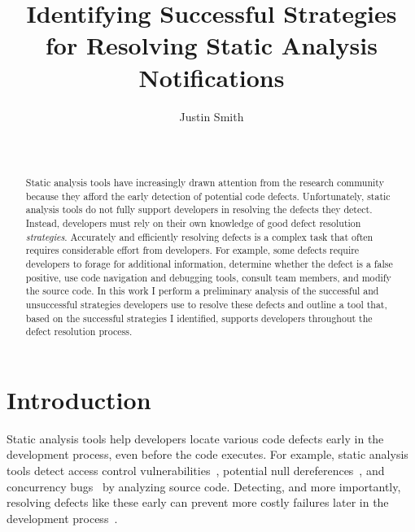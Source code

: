 \documentclass{sig-alternate}
\begin{document}
\toappear{}
\title{Identifying Successful Strategies for Resolving Static Analysis Notifications}

\author{
\alignauthor Justin Smith\\
\\
 \\
}

\maketitle


\begin{abstract}
Static analysis tools have increasingly drawn attention from the research community because they afford the early detection of potential code defects.
Unfortunately, static analysis tools do not fully support developers in resolving the defects they detect.
Instead, developers must rely on their own knowledge of good defect resolution \textit{strategies}.
Accurately and efficiently resolving defects is a complex task that often requires considerable effort from developers.
For example, some defects require developers to forage for additional information, determine whether the defect is a false positive, use code navigation and debugging tools, consult team members, and modify the source code. 
In this work I perform a preliminary analysis of the successful and unsuccessful strategies developers use to resolve these defects and outline a tool that, based on the successful strategies I identified, supports developers throughout the defect resolution process. 


\end{abstract}


\section{Introduction}
\label{sec:intro}
Static analysis tools help developers locate various code defects early in the development process, even before the code executes. 
For example, static analysis tools detect access control vulnerabilities~\cite{Aside}, potential null dereferences~\cite{FindBugs}, and concurrency bugs~\cite{ThreadSafe} by analyzing source code.
Detecting, and more importantly, resolving defects like these early can prevent more costly failures later in the development process~\cite{ayewah2008using}.
\end{document}
